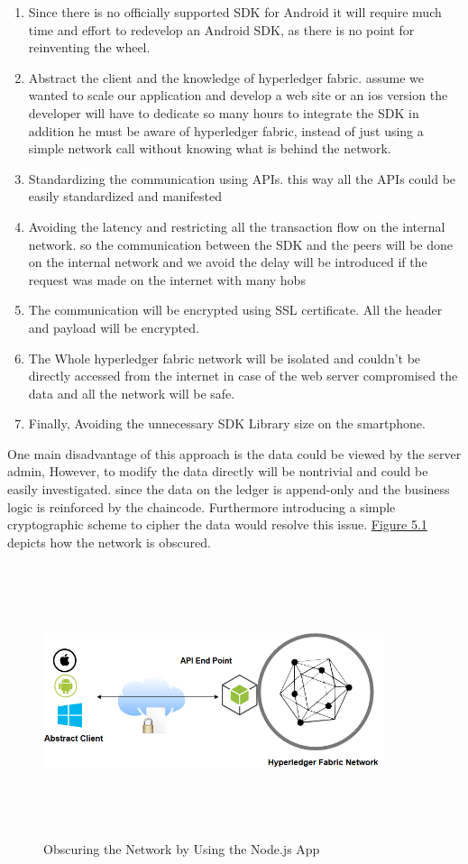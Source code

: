 \begin{enumerate}
  \item Since there is no officially supported SDK for Android it will require much time and effort to redevelop an Android SDK, as there is no point for reinventing the wheel. 
  \item Abstract the client and the knowledge of hyperledger fabric. assume we wanted to scale our application and develop a web site or an ios version the developer will have to dedicate so many hours to integrate the SDK in addition he must be aware of hyperledger fabric, instead of just using a simple network call without knowing what is behind the network.    
  \item Standardizing the communication using APIs. this way all the APIs could be easily standardized and manifested   
  \item Avoiding the latency and restricting all the transaction flow on the internal network. so the communication between the SDK and the peers will be done on the internal network and we avoid the delay will be introduced if the request was made on the internet with many hobs
  \item The communication will be encrypted using SSL certificate. All the header and payload will be encrypted.
  \item The Whole hyperledger fabric network will be isolated and couldn't be directly accessed from the internet in case of the web server compromised the data and all the network will be safe. 
  \item Finally, Avoiding the unnecessary SDK Library size on the smartphone. 
\end{enumerate}
\clearpage
\noindent One main disadvantage of this approach is the data could be viewed by the server admin, However, to modify the data directly will be nontrivial and could be easily investigated.  since the data on the ledger is append-only and the business logic is reinforced by the chaincode. Furthermore introducing a simple cryptographic scheme to cipher the data would resolve this issue. 
\hyperref[fig:enrollmentproc]{Figure 5.1} depicts how the network is obscured.  
\ \\
 \begin{figure}[H]
\center
\includegraphics[width=10cm,height=8cm]{images/issues.png}
\caption{Obscuring the Network by Using the Node.js App }
\label{fig:issues}
\end{figure}

